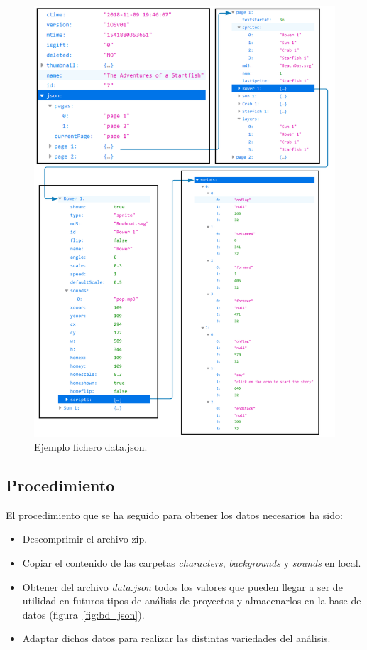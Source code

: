 \documentclass[a4paper, 12pt]{book}
\begin{document}
\begin{figure}[ht]
  \centering
  \includegraphics[width=15cm, keepaspectratio]{img/jerarquia_json.png}
  \caption{Ejemplo fichero data.json.}\label{fig:jerarquia_json}
\end{figure}

\clearpage

\subsection{Procedimiento}
\label{subsec:procedimiento}
\vspace{5mm}
El procedimiento que se ha seguido para obtener los datos necesarios ha sido:

\begin{itemize}
    \item Descomprimir el archivo zip.
    \item Copiar el contenido de las carpetas \emph{characters}, \emph{backgrounds} y \emph{sounds} en local.
    \item Obtener del archivo \emph{data.json} todos los valores que pueden llegar a ser de utilidad en futuros tipos de análisis de proyectos y almacenarlos en la base de datos (figura~\ref{fig:bd_json}).
    \item Adaptar dichos datos para realizar las distintas variedades del análisis.
\end{itemize}
\end{document}
